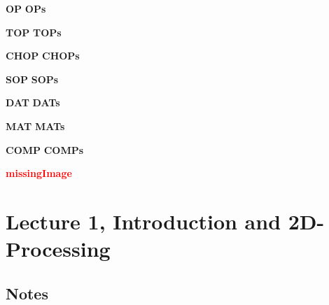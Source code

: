 \def\boldcommandlist{\@elt OP,\@elt OPs,}
\def\@elt#1,{%
 \expandafter\def\csname#1\endcsname{\textbf{#1}\xspace}
}
\boldcommandlist

\def\topColorList{\@elt TOP,\@elt TOPs,}
\def\@elt#1,{%
 \expandafter\def\csname#1\endcsname{\textcolor{TOP}{\textbf{#1}}\xspace}
}
\topColorList

\def\chopColorList{\@elt CHOP,\@elt CHOPs,}
\def\@elt#1,{%
 \expandafter\def\csname#1\endcsname{\textcolor{CHOP}{\textbf{#1}}\xspace}
}
\chopColorList

\def\sopColorList{\@elt SOP,\@elt SOPs,}
\def\@elt#1,{%
 \expandafter\def\csname#1\endcsname{\textcolor{SOP}{\textbf{#1}}\xspace}
}
\sopColorList

\def\datColorList{\@elt DAT,\@elt DATs,}
\def\@elt#1,{%
 \expandafter\def\csname#1\endcsname{\textcolor{DAT}{\textbf{#1}}\xspace}
}
\datColorList

\def\matColorList{\@elt MAT,\@elt MATs,}
\def\@elt#1,{%
 \expandafter\def\csname#1\endcsname{\textcolor{MAT}{\textbf{#1}}\xspace}
}
\matColorList


\def\compColorList{\@elt COMP,\@elt COMPs,}
\def\@elt#1,{%
 \expandafter\def\csname#1\endcsname{\textcolor{COMP}{\textbf{#1}}\xspace}
}
\compColorList

\def\redcommandlist{\@elt missingImage,}
\def\@elt#1,{%
 \expandafter\def\csname#1\endcsname{\textcolor{red}{\textbf{#1}}\xspace}
}
\redcommandlist





\chapter{Lecture 1, Introduction and 2D-Processing}
\label{chap:Introduction}
\section{Notes}
\color{textStd}

